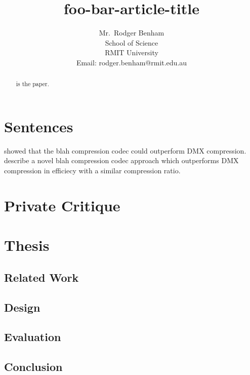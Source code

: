 \documentclass{article}
\begin{document}
\title{foo-bar-article-title}

\author{Mr.~Rodger Benham\\
School of Science\\
RMIT University\\
Email: rodger.benham@rmit.edu.au
}

\maketitle

\begin{abstract}
\citet{foo-bar-pcode} is the paper.
\end{abstract}

\section{Sentences}

\citet{foo-bar-pcode} showed that the blah compression codec could outperform DMX compression.
\citet{foo-bar-pcode} describe a novel blah compression codec approach which outperforms DMX compression in efficiecy with a similar compression ratio.


\section{Private Critique}

\section{Thesis}

\subsection{Related Work}

\subsection{Design}

\subsection{Evaluation}

\subsection{Conclusion}

\nocite{*} %


\end{document}
